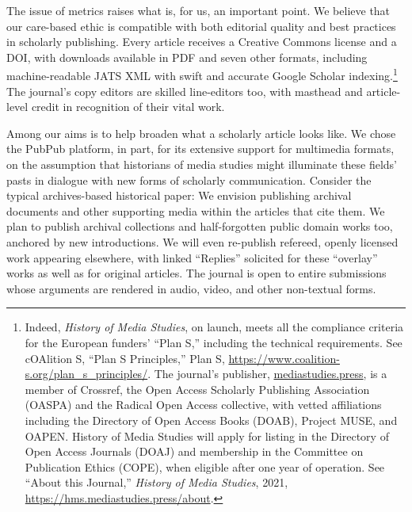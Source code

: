 \documentclass{tufte-handout}
\begin{document}
The issue of metrics raises what is, for us, an important point. We
believe that our care-based ethic is compatible with both editorial
quality and best practices in scholarly publishing. Every article
receives a Creative Commons license and a DOI, with downloads available
in PDF and seven other formats, including machine-readable JATS XML with
swift and accurate Google Scholar
indexing.\setcounter{footnote}{13}\footnote{Indeed, \emph{History of Media Studies}, on launch, meets all the
  compliance criteria for the European funders' ``Plan S,'' including
  the technical requirements. See cOAlition S, ``Plan S Principles,''
  Plan S, \url{https://www.coalition-s.org/plan_s_principles/}. The
  journal's publisher,
  \href{http://mediastudies.press}{mediastudies.press}, is a member of
  Crossref, the Open Access Scholarly Publishing Association (OASPA) and
  the Radical Open Access collective, with vetted affiliations including
  the Directory of Open Access Books (DOAB), Project MUSE, and OAPEN.
  History of Media Studies will apply for listing in the Directory of
  Open Access Journals (DOAJ) and membership in the Committee on
  Publication Ethics (COPE), when eligible after one year of operation.
  See ``About this Journal,'' \emph{History of Media Studies}, 2021,
  \url{https://hms.mediastudies.press/about}.
} The journal's copy
editors are skilled line-editors too, with masthead and article-level
credit in recognition of their vital work.

Among our aims is to help broaden what a scholarly article looks like.
We chose the PubPub platform, in part, for its extensive support for
multimedia formats, on the assumption that historians of media studies
might illuminate these fields' pasts in dialogue with new forms of
scholarly communication. Consider the typical archives-based historical
paper: We envision publishing archival documents and other supporting
media within the articles that cite them. We plan to publish archival
collections and half-forgotten public domain works too, anchored by new
introductions. We will even re-publish refereed, openly licensed work
appearing elsewhere, with linked ``Replies'' solicited for these
``overlay'' works as well as for original articles. The journal is open
to entire submissions whose arguments are rendered in audio, video, and
other non-textual forms.
\end{document}
